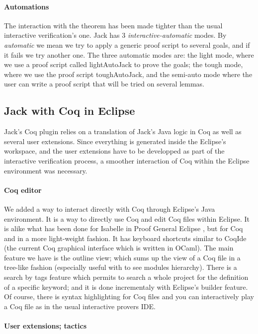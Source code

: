 \paragraph{Automations}
The interaction with the theorem has been made tighter than the usual 
interactive verification's one.
Jack has 3 {\it interactive-automatic} modes. 
By {\it automatic} we mean we 
try to apply a generic proof script to several goals, 
and if it fails we try another one. 
The three automatic modes are: the light mode, where we use a proof script
called lightAutoJack to prove the goals; 
the tough mode, where we use the proof script toughAutoJack, 
and the semi-auto mode where the user can write a proof script that will
be tried on several lemmas.



\subsection{Jack with Coq in Eclipse}
Jack's Coq plugin relies on a translation of Jack's Java logic in
Coq as well as several user extensions. Since everything is generated
inside the Eclipse's workspace, and the user extensions have to be 
developped as part of the interactive verification process,
 a smoother interaction of Coq within
the Eclipse environment was necessary.

\paragraph{Coq editor}
We added a way to interact directly with Coq through Eclipse's Java 
environment. It is a way to directly use Coq and edit Coq files within
Eclipse. It is alike what has been done for Isabelle in Proof General Eclipse 
\cite{WintersteinAL05}, but for Coq and in a more light-weight fashion.
It has keyboard shortcuts similar to CoqIde (the current Coq graphical
interface which is written in OCaml). 
The main feature we have is the outline view; 
which sums up the view of a Coq file in a tree-like fashion (especially useful
with to see modules hierarchy). There is a search by tags feature which
permits to search a whole project for the definition of a specific keyword; and
it is done incrementaly with Eclipse's builder feature. Of course, there is 
syntax highlighting for Coq files and you can interactively play a Coq file
as in the usual interactive provers IDE.


\paragraph{User extensions; tactics}

